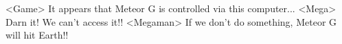 <Game> It appears that Meteor G is controlled via this computer... 
<Mega> Darn it! We can't access it!! 
<Megaman> If we don't do something, Meteor G will hit Earth!! 

